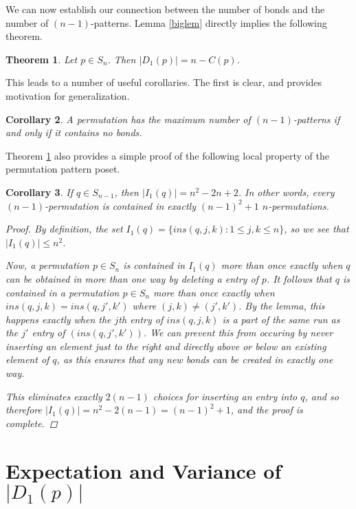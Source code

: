 \documentclass[11pt]{article}
\theoremstyle{plain}
\newtheorem{thm}{Theorem}
\newtheorem{cor}[thm]{Corollary}
\theoremstyle{definition}
\begin{document}
  We can now establish our connection between the number of bonds and the number
  of $(n-1)$-patterns. Lemma \ref{biglem} directly implies the following theorem.

  \begin{thm} \label{bigthm} Let $p \in S_n$. Then $|D_1(p)| = n- C(p)$. 
  \end{thm}


  This leads to a number of useful corollaries. The first is clear, and provides
  motivation for generalization.

  \begin{cor} \label{distinct} 
  A permutation has the maximum number of $(n-1)$-patterns if
  and only if it contains no bonds. 
  \end{cor}



  Theorem \ref{bigthm} also provides a simple proof of the following local
  property of the permutation pattern poset.

  \begin{cor} \label{n2+1} 
  If $q \in S_{n-1}$, then $|I_1(q)| = n^2 - 2n + 2 $. In other words, every
  $(n-1)$-permutation is contained in exactly $(n-1)^2 +1$ $n$-permutations. 
  \begin{proof}

  By definition, the set $I_1(q) = \{ins(q,j,k) : 1 \leq j , k \leq n\}$, so we see
  that $|I_1(q)| \leq n^2$.

  Now, a permutation $p \in S_n$ is contained in $I_1(q)$ more than once exactly
  when $q$ can be obtained in more than one way by deleting a entry of $p$. It
  follows that $q$ is contained in a permutation $p \in S_n$ more than once
  exactly when $ins(q,j,k) = ins(q,j',k')$ where $(j,k) \not = (j',k')$. By the lemma,
  this happens exactly when the $j$th entry of $ins(q,j,k)$ is a part of the same
  run as the $j'$ entry of $(ins(q,j',k'))$. We can prevent this from occuring by
  never inserting an element just to the right and directly above or below an
  existing element of $q$, as this ensures that any new bonds can be created in
  exactly one way. 

  This eliminates exactly $2(n-1)$ choices for inserting an entry into $q$, and so
  therefore $|I_1(q)| = n^2 - 2(n-1) = (n-1)^2 +1$, and the proof
  is complete.  
  \end{proof}
  \end{cor}




\section{Expectation and Variance of $|D_1(p)|$}
\end{document}
